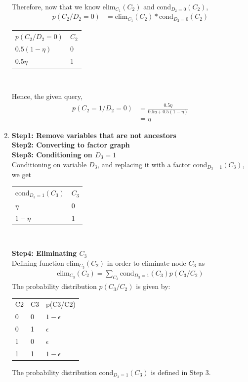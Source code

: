 \documentclass[12pt]{article}
\begin{document}
\begin{enumerate}[label=(\alph*)]
\begin{center}
\begin{tabular}{ll}
  \end{tabular} \newline \\
  \end{center}
  Therefore, now that we know elim$_{C_1}(C_2)$ and cond$_{D_2 = 0} (C_2)$,
  \begin{align*}
  p(C_2/ D_2 = 0) &= \text{elim}_{C_1}(C_2) * \text{cond}_{D_2 = 0} (C_2)
  \end{align*}
  \begin{center}
  \begin{tabular}{ll}
  $p(C_2/ D_2 = 0)$ & $C_2$  \\
  $0.5 (1-\eta)$            & 0       \\
  $0.5 \eta$               & 1       \\
  \end{tabular} \newline \\
  \end{center}
  Hence, the given query,
  \begin{align*}
  p(C_2 = 1/ D_2 = 0) &= \frac{0.5 \eta}{0.5 \eta + 0.5 (1-\eta)} \\
  &= \eta
  \end{align*}
  \item 
  \textbf{Step1: Remove variables that are not ancestors} \\
  \textbf{Step2: Converting to factor graph} \\
  \textbf{Step3: Conditioning on $D_3 = 1$} \\
  Conditioning on variable $D_3$, and replacing it with a factor cond$_{D_3 = 1}(C_3)$, we get
  \begin{center}
  \begin{tabular}{ll}
  cond$_{D_3 = 1}(C_3)$ & $C_3$  \\
  $\eta$            & 0       \\
  $1-\eta$               & 1       \\
  \end{tabular} \newline \\
  \end{center}
  \textbf{Step4: Eliminating $C_3$} \\
  Defining function elim$_{C_3}(C_2)$ in order to eliminate node $C_3$ as
  \begin{align*}
  \text{elim}_{C_3}(C_2) = \sum_{C_3} \text{cond}_{D_3 = 1}(C_3) p(C_3/C_2)
  \end{align*}
  The probability distribution $p(C_3/C_2)$ is given by:
  \begin{center}
  \begin{tabular}{lll}
  C2 & C3 & p(C3/C2)    \\
  0  & 0  & $1 - \epsilon$  \\
  0  & 1  & $\epsilon$      \\
  1  & 0  & $\epsilon$      \\
  1  & 1  & $1 - \epsilon$
  \end{tabular}
  \end{center}
  The probability distribution cond$_{D_3 = 1}(C_3)$ is defined in Step 3.
  

\end{enumerate}
\end{document}
